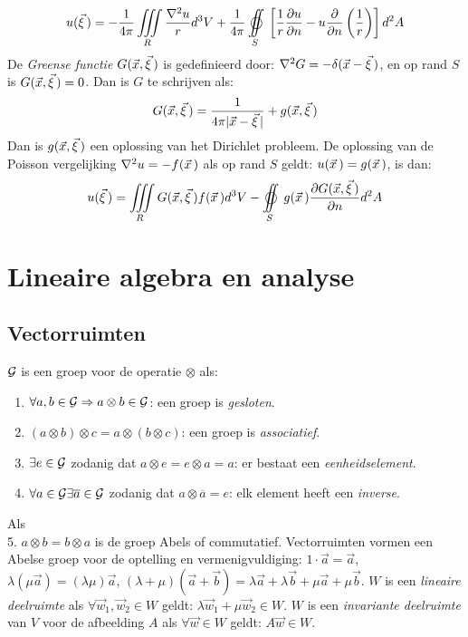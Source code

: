 \documentclass[twoside]{report}
\begin{document}
\[
u(\vvec{\xi})=-\frac{1}{4\pi}\mathop{\iiint}\limits_{\!\!\!R}\frac{\nabla^2u}{r}d^3V+
\frac{1}{4\pi}\mathop{\oiint}\limits_{\!\!\!S}\left[\frac{1}{r}\Q{u}{n}-u\Q{}{n}\left(\frac{1}{r}\right)\right]d^2A
\]
De {\it Greense functie} $G(\vec{x},\vec{\xi}\,)$ is gedefinieerd door:
$\nabla^2G=-\delta(\vec{x}-\vec{\xi}\,)$, en op rand $S$ is $G(\vec{x},\vec{\xi}\,)=0$.
Dan is $G$ te schrijven als:
\[
G(\vec{x},\vec{\xi}\,)=\frac{1}{4\pi|\vec{x}-\vec{\xi}\,|}+g(\vec{x},\vec{\xi}\,)
\]
Dan is $g(\vec{x},\vec{\xi}\,)$ een oplossing van het Dirichlet probleem. De
oplossing van de Poisson vergelijking $\nabla^2u=-f(\vec{x}\,)$ als op rand $S$
geldt: $u(\vec{x}\,)=g(\vec{x}\,)$, is dan:
\[
u(\vvec{\xi})=\mathop{\iiint}\limits_{\!\!\!R}G(\vec{x},\vvec{\xi})f(\vvec{x})d^3V-
\mathop{\oiint}\limits_{\!\!\!S}g(\vvec{x})\Q{G(\vec{x},\vvec{\xi})}{n}d^2A
\]


\chapter{Lineaire algebra en analyse}
\section{Vectorruimten}
$\cal G$ is een groep voor de operatie $\otimes$ als:
\begin{enumerate}
\item $\forall a,b\in{\cal G}\Rightarrow a\otimes b\in\cal G$: een groep is
      {\it gesloten}.
\item $(a\otimes b)\otimes c = a\otimes (b\otimes c)$: een groep is
      {\it associatief}.
\item $\exists e\in{\cal G}$ zodanig dat $a\otimes e=e\otimes a=a$: er bestaat
      een {\it eenheidselement}.
\item $\forall a\in{\cal G}\exists \overline{a}\in{\cal G}$ zodanig dat $a\otimes\overline{a}=e$:
      elk element heeft een {\it inverse}.
\end{enumerate}
Als\\
\hspace*{4.5mm}5. $a\otimes b=b\otimes a$
\npar
is de groep Abels of commutatief.
Vectorruimten vormen een Abelse groep voor de optelling en vermenigvuldiging:
$1\cdot\vec{a}=\vec{a}$, $\lambda(\mu\vec{a})=(\lambda\mu)\vec{a}$,
$(\lambda+\mu)(\vec{a}+\vec{b})=\lambda\vec{a}+\lambda\vec{b}+\mu\vec{a}+\mu\vec{b}$.
\npar
$W$ is een {\it lineaire deelruimte} als $\forall \vec{w}_1,\vec{w}_2\in W$
geldt: $\lambda\vec{w}_1+\mu\vec{w}_2\in W$.
\npar
$W$ is een {\it invariante deelruimte} van $V$ voor de afbeelding $A$ als
$\forall \vec{w}\in W$ geldt: $A\vec{w}\in W$.
\end{document}
